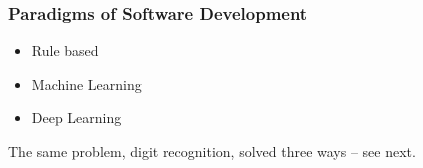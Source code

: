 

\begin{frame}[fragile] \frametitle{Paradigms of Software Development}
\begin{itemize}
\item Rule based
\item Machine Learning
\item Deep Learning
\end{itemize}
The same problem, digit recognition, solved three ways -- see next.
\end{frame}


